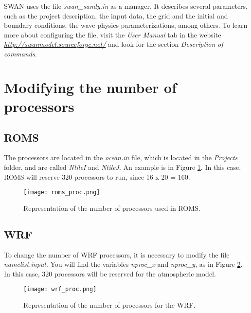 \noindent SWAN uses the file \textit{swan\_sandy.in} as a manager. It describes several parameters,
such as the project description, the input data, the grid and the initial and boundary conditions, the
wave physics parameterizations, among others. To learn more about configuring the file, visit the \textit{User Manual} tab
in the website \textcolor{bleu_cite}{\href{http://swanmodel.sourceforge.net/}{\textit{http://swanmodel.sourceforge.net/}}}
and look for the section \textit{Description of commands}.
\bigskip

\section{Modifying the number of processors}
\bigskip

\subsection{ROMS}
\bigskip

\noindent The processors are located in the \textit{ocean.in} file, which is located in the \textit{Projects} folder,
and are called \textit{NtileI} and \textit{NtileJ}. An example is in Figure \textcolor{bleu_cite}{\ref{romsproc}}.
In this case, ROMS will reserve 320 processors to run, since 16 x 20 = 160.

\bigskip

\begin{figure}[H]
    \centering
    \texttt{[image: roms\_proc.png]}
    \caption{Representation of the number of processors used in ROMS.}
    \label{romsproc}
\end{figure}
\bigskip

\subsection{WRF}
\bigskip

\noindent To change the number of WRF processors, it is necessary to modify the file \textit{namelist.input}.
You will find the variables \textit{nproc\_x} and \textit{nproc\_y}, as in Figure \textcolor{bleu_cite}{\ref{procswrf}}.
In this case, 320 processors will be reserved for the atmospheric model.

\begin{figure}[H]
    \centering
    \texttt{[image: wrf\_proc.png]}
    \caption{Representation of the number of processors for the WRF.}
    \label{procswrf}
\end{figure}
\bigskip

